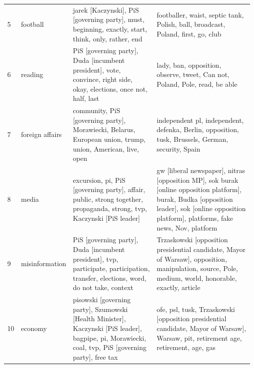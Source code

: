 \documentclass{article}
\begin{document}
\begin{otherlanguage}{polish}
\begin{longtable}{p{2cm}p{2cm}p{5cm}p{5cm}}
	5 &                 football &                                                                               jarek [Kaczynski], PiS [governing party], must, beginning, exactly, start, think, only, rather, end &                                                                                                                 footballer, waist, septic tank, Polish, ball, broadcast, Poland, first, go, club \\
	6 &                  reading &                                                              PiS [governing party], Duda [incumbent president], vote, convince, right side, okay, elections, once not, half, last &                                                                                                                      lady, ban, opposition, observe, tweet, Can not, Poland, Pole, read, be able \\
	7 &          foreign affairs &                                                                         community, PiS [governing party], Morawiecki, Belarus, European union, trump, union, American, live, open &                                                                                                independent pl, independent, defenka, Berlin, opposition, tusk, Brussels, German, security, Spain \\
	8 &                    media &                                                            excursion, pi, PiS [governing party], affair, public, strong together, propaganda, strong, tvp, Kaczynski [PiS leader] &  gw [liberal newspaper], nitras [opposition MP], sok burak [online opposition platform], burak, Budka [opposition leader], sok [online opposition platform], platforms, fake news, Nov, platform \\
	9 &           misinformation &                                               PiS [governing party], Duda [incumbent president], tvp, participate, participation, transfer, elections, word, do not take, context &                                             Trzaskowski [opposition presidential candidate, Mayor of Warsaw], opposition, manipulation, source, Pole, medium, world, honorable, exactly, article \\
	10 &                  economy &                              pisowski [governing party], Szumowski [Health Minister], Kaczynski [PiS leader], bagpipe, pi, Morawiecki, coal, tvp, PiS [governing party], free tax &                                                              ofe, psl, tusk, Trzaskowski [opposition presidential candidate, Mayor of Warsaw], Warsaw, pit, retirement age, retirement, age, gas \\

\end{longtable}
\end{otherlanguage}
\end{document}
